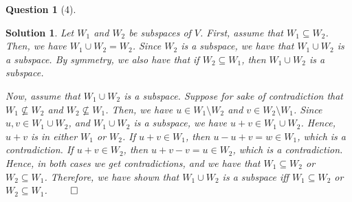 \documentclass{article} %
\theoremstyle{quest}
\newtheorem*{question}{Question}
\newtheorem*{solution}{Solution}
\begin{document}
\bigskip

\begin{question}[4]
\end{question}
\begin{solution}
Let $W_1$ and $W_2$ be subspaces of $V$. First, assume that
$W_1 \subseteq W_2$. Then, we have $W_1 \cup W_2 = W_2$. Since
$W_2$ is a subspace, we have that $W_1 \cup W_2$ is a subspace. By symmetry, we also have that if $W_2 \subseteq W_1$, then $W_1 \cup W_2$ is a subspace.

\smallskip

Now, assume that $W_1 \cup W_2$ is a subspace. 
Suppose for sake of contradiction that $W_1 \nsubseteq W_2$ and $W_2 \nsubseteq W_1$.
Then, we have $u \in W_1 \setminus W_2$ and $v \in W_2 \setminus W_1$. Since $u,v \in W_1 
\cup W_2$, and $W_1 \cup W_2$ is a subspace, we have $u + v \in W_1 \cup W_2$. Hence,
$u + v$ is in either $W_1$ or $W_2$. If $u + v \in W_1$, then $u - u + v = w \in W_1$,
which is a contradiction. If $u + v\in W_2$, then $u + v - v = u \in W_2$, which is
a contradiction. Hence, in both cases we get contradictions, and we have that
$W_1 \subseteq W_2$ or $W_2 \subseteq W_1$.
Therefore,
we have shown that $W_1 \cup W_2$ is a subspace iff $W_1 \subseteq W_2$
or $W_2 \subseteq W_1$. $\qed$ 

\end{solution}

\bigskip
\end{document}
